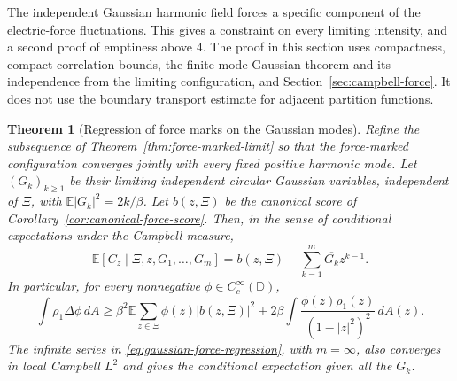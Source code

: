 \documentclass[11pt,a4paper]{article}
\numberwithin{equation}{section}
\newtheorem{theorem}{Theorem}[section]
\theoremstyle{definition}
\theoremstyle{remark}
\newcommand{\D}{\mathbb D}
\newcommand{\E}{\mathbb E}
\begin{document}
The independent Gaussian harmonic field forces a specific component
of the electric-force fluctuations. This gives a constraint on every
limiting intensity, and a second proof of emptiness above $4$.
The proof in this section uses compactness, compact correlation bounds,
the finite-mode Gaussian theorem and its independence from the limiting
configuration, and Section~\ref{sec:campbell-force}. It does not use the
boundary transport estimate for adjacent partition functions.

\begin{theorem}[Regression of force marks on the Gaussian modes]
\label{thm:gaussian-force-regression}
Refine the subsequence of Theorem~\ref{thm:force-marked-limit} so that
the force-marked configuration converges jointly with every fixed
positive harmonic mode. Let $(G_k)_{k\ge1}$ be their limiting independent
circular Gaussian variables, independent of $\Xi$, with
$\E|G_k|^2=2k/\beta$. Let $b(z,\Xi)$ be the canonical score of
Corollary~\ref{cor:canonical-force-score}. Then, in the sense of
conditional expectations under the Campbell measure,
\begin{equation}\label{eq:gaussian-force-regression}
 \E[C_z\mid\Xi,z,G_1,\ldots,G_m]
 =b(z,\Xi)-\sum_{k=1}^m\overline{G_k}z^{k-1}.
\end{equation}
In particular, for every nonnegative $\phi\in C_c^\infty(\D)$,
\begin{equation}\label{eq:gaussian-force-energy-lower}
 \int\rho_1\Delta\phi\,dA
 \ge\beta^2\E\sum_{z\in\Xi}\phi(z)|b(z,\Xi)|^2
       +2\beta\int\frac{\phi(z)\rho_1(z)}{(1-|z|^2)^2}\,dA(z).
\end{equation}
The infinite series in \eqref{eq:gaussian-force-regression}, with
$m=\infty$, also converges in local Campbell $L^2$ and gives the
conditional expectation given all the $G_k$.
\end{theorem}
\end{document}
